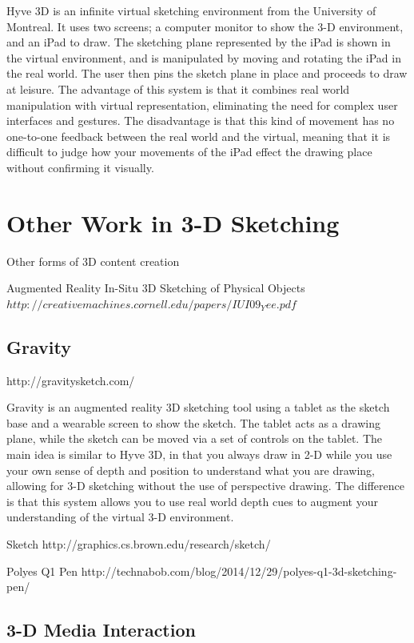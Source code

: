 \documentclass[12pt]{report}
\begin{document}
Hyve 3D is an infinite virtual sketching environment from the University of Montreal. It uses two screens; a computer monitor to show the 3-D environment, and an iPad to draw. The sketching plane represented by the iPad is shown in the virtual environment, and is manipulated by moving and rotating the iPad in the real world. The user then pins the sketch plane in place and proceeds to draw at leisure. The advantage of this system is that it combines real world manipulation with virtual representation, eliminating the need for complex user interfaces and gestures. The disadvantage is that this kind of movement has no one-to-one feedback between the real world and the virtual, meaning that it is difficult to judge how your movements of the iPad effect the drawing place without confirming it visually.



\section{Other Work in 3-D Sketching}

Other forms of 3D content creation

Augmented Reality In-Situ 3D Sketching of Physical Objects $http://creativemachines.cornell.edu/papers/IUI09_Yee.pdf$

\subsection{Gravity} http://gravitysketch.com/

Gravity is an augmented reality 3D sketching tool using a tablet as the sketch base and a wearable screen to show the sketch. The tablet acts as a drawing plane, while the sketch can be moved via a set of controls on the tablet. The main idea is similar to Hyve 3D, in that you always draw in 2-D while you use your own sense of depth and position to understand what you are drawing, allowing for 3-D sketching without the use of perspective drawing. The difference is that this system allows you to use real world depth cues to augment your understanding of the virtual 3-D environment.

Sketch http://graphics.cs.brown.edu/research/sketch/

Polyes Q1 Pen http://technabob.com/blog/2014/12/29/polyes-q1-3d-sketching-pen/

\subsection{3-D Media Interaction}
\end{document}
